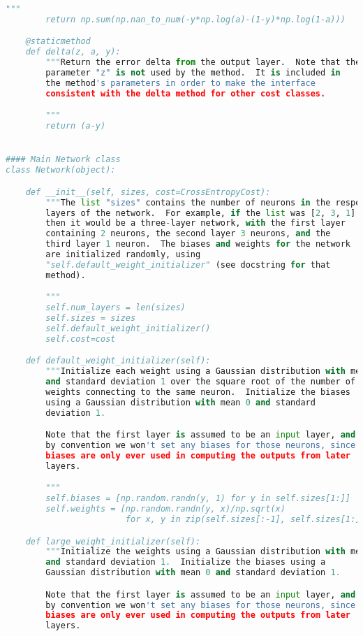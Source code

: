 \begin{fullwidth}
\begin{lstlisting}[caption={network2.py (Python 2.7)},label={lst:network2.py}, language=Python]
        """
        return np.sum(np.nan_to_num(-y*np.log(a)-(1-y)*np.log(1-a)))

    @staticmethod
    def delta(z, a, y):
        """Return the error delta from the output layer.  Note that the
        parameter "z" is not used by the method.  It is included in
        the method's parameters in order to make the interface
        consistent with the delta method for other cost classes.

        """
        return (a-y)


#### Main Network class
class Network(object):

    def __init__(self, sizes, cost=CrossEntropyCost):
        """The list "sizes" contains the number of neurons in the respective
        layers of the network.  For example, if the list was [2, 3, 1]
        then it would be a three-layer network, with the first layer
        containing 2 neurons, the second layer 3 neurons, and the
        third layer 1 neuron.  The biases and weights for the network
        are initialized randomly, using
        "self.default_weight_initializer" (see docstring for that
        method).

        """
        self.num_layers = len(sizes)
        self.sizes = sizes
        self.default_weight_initializer()
        self.cost=cost

    def default_weight_initializer(self):
        """Initialize each weight using a Gaussian distribution with mean 0
        and standard deviation 1 over the square root of the number of
        weights connecting to the same neuron.  Initialize the biases
        using a Gaussian distribution with mean 0 and standard
        deviation 1.

        Note that the first layer is assumed to be an input layer, and
        by convention we won't set any biases for those neurons, since
        biases are only ever used in computing the outputs from later
        layers.

        """
        self.biases = [np.random.randn(y, 1) for y in self.sizes[1:]]
        self.weights = [np.random.randn(y, x)/np.sqrt(x)
                        for x, y in zip(self.sizes[:-1], self.sizes[1:])]

    def large_weight_initializer(self):
        """Initialize the weights using a Gaussian distribution with mean 0
        and standard deviation 1.  Initialize the biases using a
        Gaussian distribution with mean 0 and standard deviation 1.

        Note that the first layer is assumed to be an input layer, and
        by convention we won't set any biases for those neurons, since
        biases are only ever used in computing the outputs from later
        layers.


\end{lstlisting}
\end{fullwidth}
